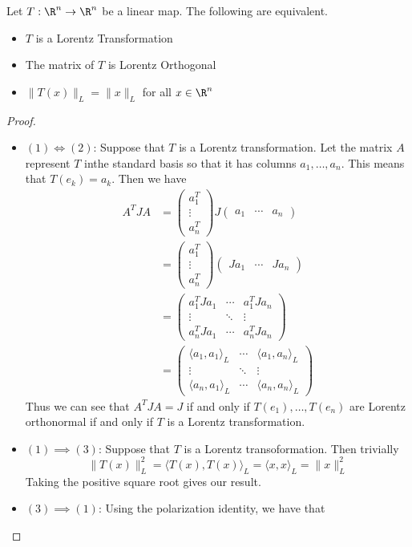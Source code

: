 \documentclass[a4paper]{article}
\begin{document}
\begin{prp}{}{} Let $T:\R^n\to\R^n$ be a linear map. The following are equivalent. 
\begin{itemize}
\item $T$ is a Lorentz Transformation
\item The matrix of $T$ is Lorentz Orthogonal
\item $\|T(x)\|_L=\|x\|_L$ for all $x\in\R^n$
\end{itemize} \tcbline
\begin{proof}~\\
\begin{itemize}
\item $(1)\iff(2)$: Suppose that $T$ is a Lorentz transformation. Let the matrix $A$ represent $T$ inthe standard basis so that it has columns $a_1,\dots,a_n$. This means that $T(e_k)=a_k$. Then we have 
\begin{align*}
A^TJA&=\begin{pmatrix}
a_1^T\\\vdots\\a_n^T
\end{pmatrix}J\begin{pmatrix}
a_1 & \cdots & a_n
\end{pmatrix}\\
&=\begin{pmatrix}
a_1^T\\\vdots\\a_n^T
\end{pmatrix}\begin{pmatrix}
Ja_1 & \cdots & Ja_n
\end{pmatrix}\\
&=\begin{pmatrix}
a_1^TJa_1 & \cdots & a_1^TJa_n\\
\vdots & \ddots & \vdots\\
a_n^TJa_1 & \cdots & a_n^TJa_n
\end{pmatrix}\\
&=\begin{pmatrix}
\langle a_1,a_1\rangle_L & \cdots & \langle a_1,a_n\rangle_L\\
\vdots & \ddots & \vdots\\
\langle a_n,a_1\rangle_L & \cdots & \langle a_n,a_n\rangle_L
\end{pmatrix}
\end{align*}
Thus we can see that $A^TJA=J$ if and only if $T(e_1),\dots, T(e_n)$ are Lorentz orthonormal if and only if $T$ is a Lorentz transformation. 
\item $(1)\implies(3)$: Suppose that $T$ is a Lorentz transoformation. Then trivially $$\|T(x)\|_L^2=\langle T(x),T(x)\rangle_L=\langle x,x\rangle_L=\|x\|_L^2$$ Taking the positive square root gives our result. 
\item $(3)\implies(1)$: Using the polarization identity, we have that 
\end{itemize}
\end{proof}
\end{prp}
\end{document}
